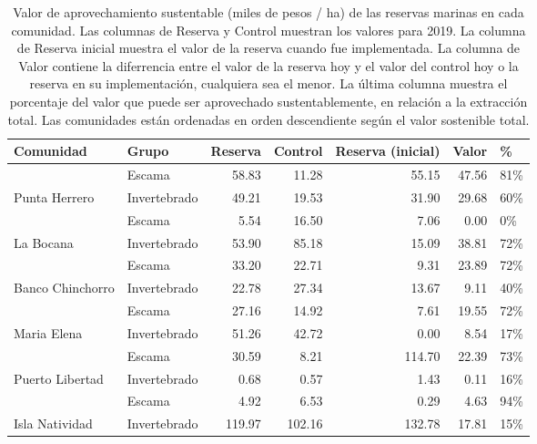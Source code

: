 \begin{table}[!h]

\caption{\label{tab:sust_val}Valor de aprovechamiento sustentable (miles de pesos / ha) de las reservas marinas en cada comunidad. Las columnas de Reserva y Control muestran los valores para 2019. La columna de Reserva inicial muestra el valor de la reserva cuando fue implementada. La columna de Valor contiene la diferrencia entre el valor de la reserva hoy y el valor del control hoy o la reserva en su implementación, cualquiera sea el menor. La última columna muestra el porcentaje del valor que puede ser aprovechado sustentablemente, en relación a la extracción total. Las comunidades están ordenadas en orden descendiente según el valor sostenible total.}
\centering
\begin{tabular}[t]{llrrrrl}
\toprule
Comunidad & Grupo & Reserva & Control & Reserva (inicial) & Valor & \%\\
\midrule
 & Escama & 58.83 & 11.28 & 55.15 & 47.56 & 81\%\\
\cmidrule{2-7}
\multirow{-2}{*}{\raggedright\arraybackslash Punta Herrero} & Invertebrado & 49.21 & 19.53 & 31.90 & 29.68 & 60\%\\
\cmidrule{1-7}
 & Escama & 5.54 & 16.50 & 7.06 & 0.00 & 0\%\\
\cmidrule{2-7}
\multirow{-2}{*}{\raggedright\arraybackslash La Bocana} & Invertebrado & 53.90 & 85.18 & 15.09 & 38.81 & 72\%\\
\cmidrule{1-7}
 & Escama & 33.20 & 22.71 & 9.31 & 23.89 & 72\%\\
\cmidrule{2-7}
\multirow{-2}{*}{\raggedright\arraybackslash Banco Chinchorro} & Invertebrado & 22.78 & 27.34 & 13.67 & 9.11 & 40\%\\
\cmidrule{1-7}
 & Escama & 27.16 & 14.92 & 7.61 & 19.55 & 72\%\\
\cmidrule{2-7}
\multirow{-2}{*}{\raggedright\arraybackslash Maria Elena} & Invertebrado & 51.26 & 42.72 & 0.00 & 8.54 & 17\%\\
\cmidrule{1-7}
 & Escama & 30.59 & 8.21 & 114.70 & 22.39 & 73\%\\
\cmidrule{2-7}
\multirow{-2}{*}{\raggedright\arraybackslash Puerto Libertad} & Invertebrado & 0.68 & 0.57 & 1.43 & 0.11 & 16\%\\
\cmidrule{1-7}
 & Escama & 4.92 & 6.53 & 0.29 & 4.63 & 94\%\\
\cmidrule{2-7}
\multirow{-2}{*}{\raggedright\arraybackslash Isla Natividad} & Invertebrado & 119.97 & 102.16 & 132.78 & 17.81 & 15\%\\

\end{tabular}
\end{table}
